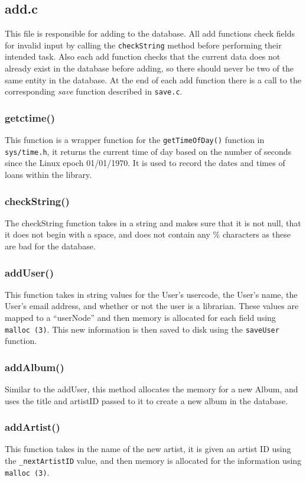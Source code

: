 \documentclass{article}
\begin{document}
\subsection{add.c}
This file is responsible for adding to the database. All add functions check fields for invalid input by calling the \verb|checkString| method before performing their intended task. Also each add function checks that the current data does not already exist in the database before adding, so there should never be two of the same entity in the database. At the end of each add function there is a call to the corresponding \emph{save} function described in \verb|save.c|.

\subsubsection*{getctime()}
 This function is a wrapper function for the \verb|getTimeOfDay()| function in \verb|sys/time.h|, it returns the current time of day based on the number of seconds since the Linux epoch 01/01/1970. It is used to record the dates and times of loans within the library.

\subsubsection*{checkString()}
 The checkString function takes in a string and makes sure that it is not null, that it does not begin with a space,  and does not contain any \% characters as these are bad for the database.

\subsubsection*{addUser()}
This function takes in string values for the User's usercode, the User's name, the User's email address, and whether or not the user is a librarian.  These values are mapped to a ``userNode'' and then memory is allocated for each field using \verb|malloc (3)|. This new information is then saved to disk using the \verb|saveUser| function.

\subsubsection*{addAlbum()}
Similar to the addUser, this method allocates the memory for a new Album, and uses the title and artistID passed to it to create a new album in the database. 

\subsubsection*{addArtist()}
This function takes in the name of the new artist, it is given an artist ID using the \verb|_nextArtistID| value, and then memory is allocated for the information using \verb|malloc (3)|.
\end{document}
